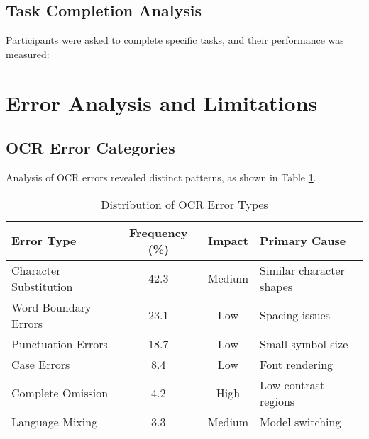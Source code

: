 \subsection{Task Completion Analysis}

Participants were asked to complete specific tasks, and their performance was measured:

\begin{table}[h!]
\centering
\caption{Task Completion Metrics from User Study}
\label{tab:task-completion}
\end{table}

\section{Error Analysis and Limitations}
\label{sec:error-analysis}

\subsection{OCR Error Categories}

Analysis of OCR errors revealed distinct patterns, as shown in Table \ref{tab:ocr-errors}.

\begin{table}[h!]
\centering
\caption{Distribution of OCR Error Types}
\label{tab:ocr-errors}
\begin{tabular}{|l|c|c|l|}
\hline
\textbf{Error Type} & \textbf{Frequency (\%)} & \textbf{Impact} & \textbf{Primary Cause} \\
\hline
Character Substitution & 42.3 & Medium & Similar character shapes \\
Word Boundary Errors & 23.1 & Low & Spacing issues \\
Punctuation Errors & 18.7 & Low & Small symbol size \\
Case Errors & 8.4 & Low & Font rendering \\
Complete Omission & 4.2 & High & Low contrast regions \\
Language Mixing & 3.3 & Medium & Model switching \\
\hline
\end{tabular}
\end{table}

